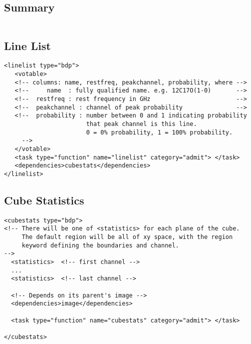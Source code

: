 \documentclass{article}
\begin{document}
\subsection{Summary}
\footnotesize
\begin{verbatim}
\end{verbatim}

\subsection{Line List}
\footnotesize
\begin{verbatim}
<linelist type="bdp">
   <votable>
   <!-- columns: name, restfreq, peakchannel, probability, where -->
   <!--     name  : fully qualified name. e.g. 12C17O(1-0)       -->
   <!--  restfreq : rest frequency in GHz                        -->
   <!--  peakchannel : channel of peak probability               -->
   <!--  probability : number between 0 and 1 indicating probability
                       that peak channel is this line. 
                       0 = 0% probability, 1 = 100% probability.
     -->
   </votable>
   <task type="function" name="linelist" category="admit"> </task>
   <dependencies>cubestats</dependencies>
</linelist>

\end{verbatim}

\subsection{Cube Statistics}
\footnotesize
\begin{verbatim}
<cubestats type="bdp">
<!-- There will be one of <statistics> for each plane of the cube. 
     The default region will be all of xy space, with the region 
     keyword defining the boundaries and channel. 
-->
  <statistics>  <!-- first channel -->
  ...
  <statistics>  <!-- last channel -->

  <!-- Depends on its parent's image -->
  <dependencies>image</dependencies>

  <task type="function" name="cubestats" category="admit"> </task>

</cubestats>
\end{verbatim}
\end{document}
